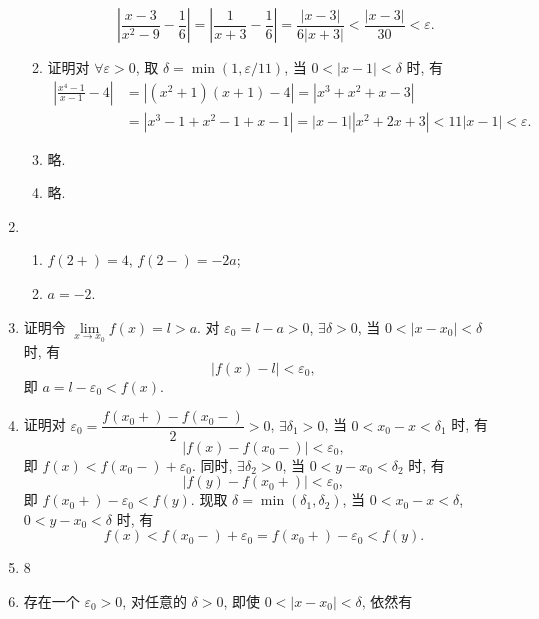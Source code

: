 \begin{enumerate}
\begin{enumerate}[(1)]
                \[
                    \left|\frac{x-3}{x^2-9} - \frac16\right| = \left|\frac{1}{x+3} - \frac16\right| = \frac{|x-3|}{6|x+3|} < \frac{|x-3|}{30} < \varepsilon.
                \]
            \item %
                {\heiti 证明}\quad 对 $\forall \varepsilon > 0$, 取 $\delta = \min(1, \varepsilon/11)$, 当 $0 < |x - 1| < \delta$ 时, 有
                \begin{align*}
                    \left| \frac{x^4-1}{x-1} - 4 \right| &= |(x^2+1)(x+1) - 4| = |x^3 + x^2 + x - 3| \\
                                                         &= |x^3 - 1 + x^2 - 1 + x - 1| = |x - 1||x^2 + 2x + 3| < 11|x - 1| < \varepsilon.
                \end{align*}
            \item %
                略.
            \item %
                略.
        \end{enumerate}
    \item %
        \begin{enumerate}[(1)]
            \item %
                $f(2+) = 4$, $f(2-) = -2a$;
            \item %
                $a = -2$.
        \end{enumerate}
    \item %
        {\heiti 证明}\quad 令 $\lim\limits_{x\to x_0}f(x) = l > a$. 对 $\varepsilon_0 = l - a > 0$, $\exists \delta > 0$, 当 $0 < |x - x_0| < \delta$ 时, 有
        \[
            |f(x) - l| < \varepsilon_0,    
        \]
        即 $a = l - \varepsilon_0 < f(x)$.
    \item %
        {\heiti 证明}\quad 对 $\varepsilon_0 = \dfrac{f(x_0+) - f(x_0-)}{2} > 0$, $\exists \delta_1 > 0$, 当 $0 < x_0 - x < \delta_1$ 时, 有
        \[
            |f(x) - f(x_0-)| < \varepsilon_0,    
        \]
        即 $f(x) < f(x_0-) + \varepsilon_0$. 同时, $\exists \delta_2 > 0$, 当 $0 < y - x_0 < \delta_2$ 时, 有
        \[
            |f(y) - f(x_0+)| < \varepsilon_0,    
        \]
        即 $f(x_0+) - \varepsilon_0 < f(y)$. 现取 $\delta = \min(\delta_1, \delta_2)$, 当 $0 < x_0 - x < \delta$, $0 < y - x_0 < \delta$ 时, 有
        \[
            f(x) < f(x_0-) + \varepsilon_0 = f(x_0+) - \varepsilon_0 < f(y).
        \]
    \item 8
    \item %
        存在一个 $\varepsilon_0 > 0$, 对任意的 $\delta > 0$, 即使 $0 < |x - x_0| < \delta$, 依然有

\end{enumerate}
